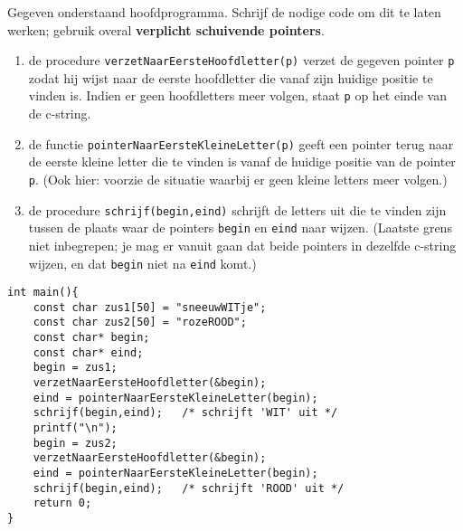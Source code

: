 \beginoef
%
Gegeven onderstaand hoofdprogramma. Schrijf de nodige code om dit te laten werken; gebruik overal {\bf verplicht schuivende pointers}.
\begin{enumerate}
\item de procedure \verb}verzetNaarEersteHoofdletter(p)} verzet de gegeven pointer \verb}p} zodat hij wijst naar de eerste hoofdletter die vanaf zijn huidige positie te vinden is. Indien er geen hoofdletters meer volgen, staat \verb}p} op het einde van de c-string.
\item de functie \verb}pointerNaarEersteKleineLetter(p)} geeft een pointer terug naar
de eerste kleine letter die te vinden is vanaf de huidige positie van de pointer \verb}p}.
(Ook hier: voorzie de situatie waarbij er geen kleine letters meer volgen.)
\item de procedure \verb}schrijf(begin,eind)} schrijft de letters uit die te vinden zijn
tussen de plaats waar de pointers \verb}begin} en \verb}eind} naar wijzen. (Laatste grens niet inbegrepen; je mag er vanuit gaan dat beide pointers in dezelfde c-string wijzen, en dat \verb}begin} niet na \verb}eind} komt.)
\end{enumerate}
\begin{footnotesize}
\begin{verbatim}
int main(){	
    const char zus1[50] = "sneeuwWITje";
    const char zus2[50] = "rozeROOD";                                        
    const char* begin;
    const char* eind;	   
    begin = zus1;
    verzetNaarEersteHoofdletter(&begin);	
    eind = pointerNaarEersteKleineLetter(begin);		
    schrijf(begin,eind);   /* schrijft 'WIT' uit */
    printf("\n");	    
    begin = zus2;
    verzetNaarEersteHoofdletter(&begin);
    eind = pointerNaarEersteKleineLetter(begin);	
    schrijf(begin,eind);   /* schrijft 'ROOD' uit */	
    return 0;
}
\end{verbatim}
\end{footnotesize}
\endoef

